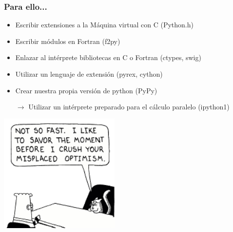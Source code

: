\documentclass{beamer}
\begin{document}
\begin{frame}
  \frametitle{Para ello...}
  \begin{itemize}
  \item Escribir extensiones a la Máquina virtual con C (Python.h)
  \item Escribir módulos en Fortran (f2py)
  \item Enlazar al intérprete bibliotecas en C o Fortran (ctypes,
    swig)
  \item Utilizar un lenguaje de extensión (pyrex, cython)
  \item Crear nuestra propia versión de python (PyPy)
  \item[$\rightarrow$] Utilizar un intérprete preparado para el cálculo paralelo
    (ipython1)
  \end{itemize}
\end{frame}

\begin{frame}
\begin{center}
 \includegraphics[width=6cm]{files/catbert.png}\\
\end{center}
\end{frame}


\begin{frame}
  \begin{center}
    \begin{Huge}
    \end{Huge}
  \end{center}
\end{frame}

\end{document}
